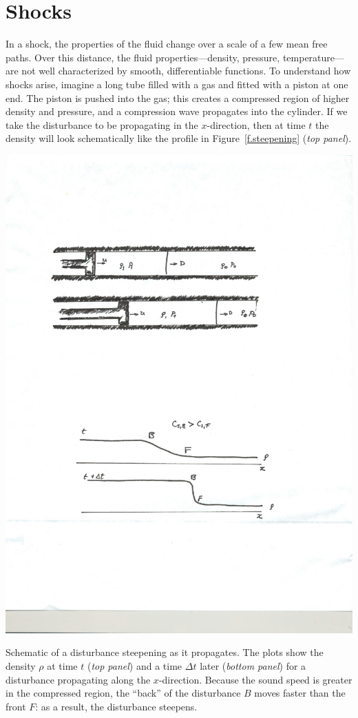 \section{Shocks}
\newcommand{\gpo}{\ensuremath{(\gamma+1)}}
\newcommand{\gmo}{\ensuremath{(\gamma-1)}}

In a shock, the properties of the fluid change over a scale of a few mean free paths.  Over this distance, the fluid properties---density, pressure, temperature---are not well characterized by smooth, differentiable functions. To understand how shocks arise, imagine a long tube filled with a gas and fitted with a piston at one end. The piston is pushed into the gas; this creates a compressed region of higher density and pressure, and a compression wave propagates into the cylinder.  If we take the disturbance to be propagating in the $x$-direction, then at time $t$ the density will look schematically like the profile in Figure~\ref{f.steepening} (\emph{top panel}).

\begin{marginfigure}
\includegraphics[width=\textwidth]{shock-formation}
\caption[Schematic of a disturbance steepening as it propagates.]{Schematic of a disturbance steepening as it propagates.  The plots show the density $\rho$ at time $t$ (\emph{top panel}) and a time $\Delta t$ later (\emph{bottom panel}) for a disturbance propagating along the $x$-direction.  Because the sound speed is greater in the compressed region, the ``back'' of the disturbance $B$ moves faster than the front $F$: as a result, the disturbance steepens. }
\label{f.steepening}
\end{marginfigure}

